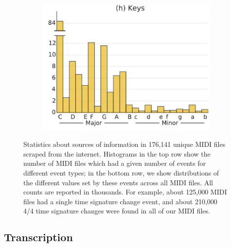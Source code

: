 \documentclass{article}
\begin{document}
\begin{figure}
\begin{subfigure}{.23\textwidth}
    \end{subfigure}
    \begin{subfigure}{.23\textwidth}
        \includegraphics[width=\textwidth]{keys.pdf}
    \end{subfigure}
    \caption{Statistics about sources of information in 176,141 unique MIDI files scraped from the internet.
    Histograms in the top row show the number of MIDI files which had a given number of events for different event types; in the bottom row, we show distributions of the different values set by these events across all MIDI files.
    All counts are reported in thousands.
    For example, about 125,000 MIDI files had a single time signature change event, and about 210,000 4/4 time signature changes were found in all of our MIDI files.}
    \label{fig:statistics}
\end{figure}

\subsection{Transcription}
\end{document}

